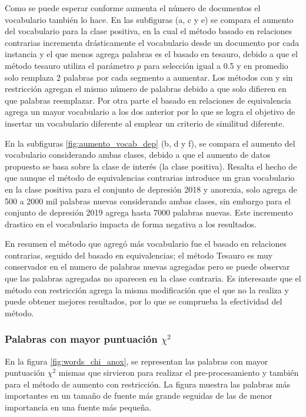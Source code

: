 Como se puede esperar conforme aumenta el número de documentos el vocabulario también lo hace. En las subfiguras (a, c y e) se compara el aumento del vocabulario para la clase positiva, en la cual el método basado en relaciones contrarias incrementa drásticamente el vocabulario desde un documento por cada instancia y el que menos agrega palabras es el basado en tesauro, debido a que el método tesauro utiliza el parámetro $p$ para selección igual a 0.5 y en promedio solo remplaza 2 palabras por cada segmento a aumentar. Los métodos con y sin restricción agregan el mismo número de palabras debido a que solo difieren en que palabras reemplazar. Por otra parte el basado en relaciones de equivalencia agrega un mayor vocabulario a los dos anterior por lo que se logra el objetivo de insertar un vocabulario diferente al emplear un criterio de similitud diferente.

En la subfiguras \ref{fig:aumento_vocab_dep} (b, d y f), se compara el aumento del vocabulario considerando ambas clases, debido a que el aumento de datos propuesto se basa sobre la clase de interés (la clase positiva). Resalta el hecho de que aunque el método de equivalencias contrarias introduce un gran vocabulario en la clase positiva para el conjunto de depresión 2018 y anorexia, solo agrega de 500 a 2000 mil palabras nuevas considerando ambas clases, sin embargo para el conjunto de depresión 2019 agrega hasta 7000 palabras nuevas. Este incremento drastico en el vocabulario impacta de forma negativa a los resultados. 

En resumen el método que agregó más vocabulario fue el basado en relaciones contrarias, seguido del basado en equivalencias; el método Tesauro es muy conservador en el numero de palabras nuevas agregadas pero se puede observar que las palabras agregadas no aparecen en la clase contraria. Es interesante que el método con restricción agrega la misma modificación que el que no la realiza y puede obtener mejores resultados, por lo que se comprueba la efectividad del método. 



\subsubsection{Palabras con mayor puntuación $\chi^2$}
En la figura \ref{fig:words_chi_anox}, se representan las palabras con mayor puntuación $\chi^2$ mismas que sirvieron para realizar el pre-procesamiento y también para el método de aumento con restricción. La figura muestra las palabras más importantes en un tamaño de fuente más grande seguidas de las de menor importancia en una fuente más pequeña. 

